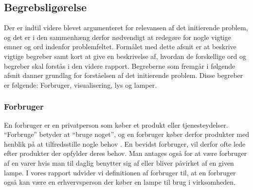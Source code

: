 \subsection{Begrebsligørelse}

Der er indtil videre blevet  argumenteret for relevansen af det initierende problem, og det er i den sammenhæng derfor nødvendigt at redegøre for nogle vigtige emner og ord indenfor problemfeltet. 
\newline Formålet med dette afsnit er at beskrive vigtige begreber samt kort at give en beskrivelse af, hvordan de forskellige ord og begreber skal forstås i den videre rapport. Begreberne som fremgår i følgende afsnit danner grundlag for forståelsen af det initierende problem. Disse begreber er følgende: Forbruger, visualisering, lys og lamper.


\subsubsection{Forbruger}
En forbruger er en privatperson som køber et produkt eller tjenesteydelser. “Forbruge” betyder at “bruge noget”, og en forbruger køber derfor produkter med henblik på at tilfredsstille nogle behov \cite{forbrugerportalen}. En bevidst forbruger, vil derfor ofte lede efter produkter der opfylder deres behov. Man antages også for at være forbruger af en varer hvis man til daglig benytter sig af eller bliver påvirket af en given lampe.
\newline I vores rapport udvider vi definitionen af forbruger til, at en forbruger også kan være en erhvervsperson der køber en lampe til brug i virksomheden.


